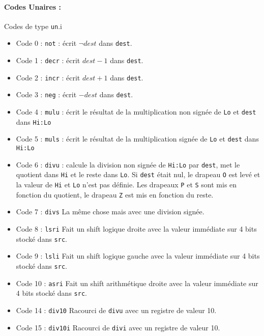 \documentclass[12pt]{article}
\begin{document}
\paragraph{Codes Unaires :} Codes de type \verb!un!.i
\begin{itemize}
\item Code 0 : \verb!not! : écrit $\neg dest$ dans \verb!dest!.
\item Code 1 : \verb!decr! : écrit $dest-1$ dans \verb!dest!.
\item Code 2 : \verb!incr! : écrit $dest +1$ dans \verb!dest!.
\item Code 3 : \verb!neg! : écrit $ - dest$ dans \verb!dest!.
\item Code 4 : \verb!mulu! : écrit le résultat de la multiplication non signée de
  \verb!Lo! et \verb!dest! dans \verb!Hi:Lo! 
\item Code 5 : \verb!muls! : écrit le résultat de la multiplication signée de
  \verb!Lo! et \verb!dest! dans \verb!Hi:Lo! 
\item Code 6 : \verb!divu! : calcule la division non signée de \verb!Hi:Lo! par
  \verb!dest!, met le quotient dans \verb!Hi! et le reste dans \verb!Lo!. Si
  \verb!dest! était nul, le drapeau \verb!O! est levé et la valeur de
  \verb!Hi! et \verb!Lo! n'est pas définie.
  Les drapeaux \verb!P! et \verb!S! sont mis en fonction du quotient, le
  drapeau \verb!Z! est mis en fonction du reste.
\item Code 7 : \verb!divs! La même chose mais avec une division signée.
\item Code 8 : \verb!lsri! Fait un shift logique droite avec la valeur immédiate
  sur 4 bits stocké dans \verb!src!.
\item Code 9 : \verb!lsli! Fait un shift logique gauche avec la valeur immédiate
  sur 4 bits stocké dans \verb!src!.
\item Code 10 : \verb!asri! Fait un shift arithmétique droite avec la valeur immédiate
  sur 4 bits stocké dans \verb!src!.
\item Code 14 : \verb!div10! Racourci de \verb!divu! avec un registre de valeur 10.
\item Code 15 : \verb!div10i! Racourci de \verb!divi! avec un registre de valeur 10.
\end{itemize}
\end{document}
